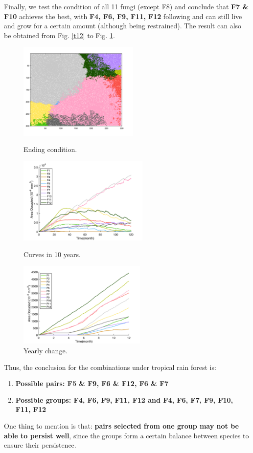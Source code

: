 \documentclass[a4paper,12pt]{article}
\begin{document}
Finally, we test the condition of all 11 fungi (except F8) and conclude that \textbf{F7 \& F10 }achieves the best, with \textbf{F4, F6, F9, F11, F12} following and can still live and grow for a certain amount (although being restrained). The result can also be obtained from Fig. \ref{t12} to Fig. \ref{yt12}.
\begin{figure}[]
	\begin{minipage}{29ex}
	\includegraphics[height=4.8cm]{./formal/tropical/11[3].png}
	\caption{Ending condition.}
	\label{t12}
\end{minipage}   
\begin{minipage}{31ex}

	\includegraphics[height=4.3cm]{./formal/tropical/11[2].png}
	\caption{Curves in 10 years.}
\end{minipage}
\begin{minipage}{29ex}
\centering
	\includegraphics[height=4.2cm]{./formal/tropical/11[1].png}
	\caption{Yearly change.}
	\label{yt12}
\end{minipage} 
\end{figure}
Thus, the conclusion for the combinations under tropical rain forest is:
\begin{enumerate}
\setlength{\itemsep}{0ex} %
\item \textbf{Possible pairs: F5 \& F9, F6 \& F12, F6 \& F7}
\item \textbf{Possible groups: F4, F6, F9, F11, F12 and F4, F6, F7, F9, F10, F11, F12}
\end{enumerate} One thing to mention is that: \textbf{pairs selected from one group may not be able to persist well}, since the groups form a certain balance between species to ensure their persistence.
\end{document}
